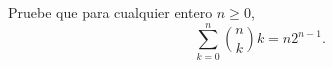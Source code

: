 \begin{statement}{29}
  Pruebe que para cualquier entero $n \geq 0$,
  \[
    \sum_{k = 0}^n \binom{n}{k} k = n 2^{n - 1}.
  \]
\end{statement}